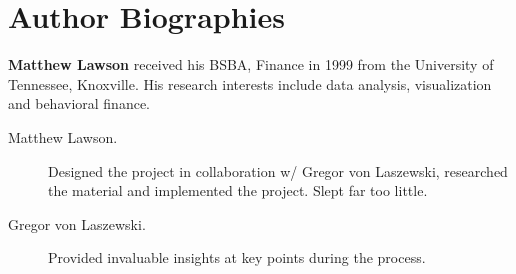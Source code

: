 \documentclass[9pt,twocolumn,twoside]{../../styles/osajnl}
\begin{document}
\section*{Author Biographies}
\begingroup
\setlength\intextsep{0pt}
\begin{minipage}[t][3.2cm][t]{1.0\columnwidth} %
  \noindent
  {\bfseries Matthew Lawson} received his BSBA, Finance in 1999 from
  the University of Tennessee, Knoxville. His research interests include
  data analysis, visualization and behavioral finance.
\end{minipage}
\endgroup

\appendix
\begin{description}

\item[Matthew Lawson.] Designed the project in collaboration w/ Gregor von Laszewski, researched the material and implemented the project.  Slept far too little.

\item[Gregor von Laszewski.] Provided invaluable insights at key points during the process.

\end{description}
\end{document}
